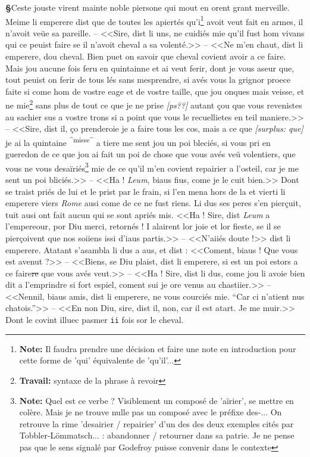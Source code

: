 \documentclass[12pt]{article} %
\newcommand{\persName}[1]{\emph{#1}} %
\newcommand{\placeName}[1]{\emph{#1}} %
\newcommand{\num}[1]{\texttt{#1}}    %
\newcommand{\add}[1]{\textsuperscript{#1}}       %
\newcommand{\uncertain}[1]{\textit{[#1?]}} %
\newcommand{\fnnote}[1]{\footnote{\textbf{Note:} #1}} %
\newcommand{\fnworknote}[1]{\footnote{\textbf{Travail:} #1}} %
\newcommand{\del}[1]{\sout{#1}}      %
\newcommand{\surplus}[1]{\textit{[surplus: #1]}} %
\newcounter{paranum}
\newcommand{\pnum}{\stepcounter{paranum}\textbf{§\arabic{paranum}}\quad}
\begin{document}
\pnum Ceste jouste virent mainte noble piersone qui mout en orent grant merveille. Meime li emperere dist que de toutes les apiertés qu'i\fnnote{Il faudra prendre une décision et faire une note en introduction pour cette forme de 'qui' équivalente de 'qu'il'...} avoit veut fait en armes, il n'avoit veüe sa pareille. -- <<Sire, dist li uns, ne cuidiés mie qu'il fust hom vivans qui ce peuist faire se il n'avoit cheval a sa volenté.>> -- <<Ne m'en chaut, dist li emperere, dou cheval. Bien puet on savoir que cheval covient avoir a ce faire. Mais jou aucune fois feru en quintainne et ai veut ferir, dont je vous aseur que, tout peuist on ferir de tous lés sans mesprendre, si avés vous la grignor proece faite si come hom de vostre eage et de vostre taille, que jou onques mais veisse, et ne mie\fnworknote{syntaxe de la phrase à revoir} sans plus de tout ce que je ne prise \uncertain{ps?} autant çou que vous revenistes au sachier sus a vostre trons si a point que vous le recuellietes en teil maniere.>> -- <<Sire, dist il, ço prenderoie je a faire tous les cos, mais a ce que \surplus{que} je ai la quintaine \add{^misse^} a tiere me sent jou un poi bleciés, si vous pri en gueredon de ce que jou ai fait un poi de chose que vous avés veü volentiers, que vous ne vous desaïriés\fnnote{Quel est ce verbe ? Visiblement un composé de 'aïrier', se mettre en colère. Mais je ne trouve nulle pas un composé avec le préfixe des-... On retrouve la rime 'desairier / repairier' d'un des des deux exemples cités par Tobbler-Lömmatsch... : abandonner / retourner dans sa patrie. Je ne pense pas que le sens signalé par Godefroy puisse convenir dans le contexte} mie de ce qu'il m'en covient repairier a l'osteil, car je me sent un poi bliciés.>> -- <<Ha ! \persName{Leum}, biaus fius, come je le cuit bien.>> Dont se traist priés de lui et le prist par le frain, si l'en mena hors de la et vierti li emperere viers \placeName{Rome} ausi come de ce ne fust riens. Li dus ses peres s'en pierçuit, tuit ausi ont fait aucun qui se sont apriés mis. <<Ha ! Sire, dist \persName{Leum} a l'empereour, por Diu merci, retornés ! I alairent lor joie et lor fieste, se il se pierçoivent que nos soiiens issi d'iaus partis.>> -- <<N'aiiés doute !>> dist li emperere. Atatant s'asambla li dus a aus, et dist : <<Coment, biaus ! Que vous est avenut ?>> -- <<Biens, se Diu plaist, dist li emperere, si est un poi estors a ce faire\del{re} que vous avés veut.>> -- <<Ha ! Sire, dist li dus, come jou li avoie bien dit a l'emprindre si fort espiel, coment sui je ore venus au chastiier.>> -- <<Nennil, biaus amis, dist li emperere, ne vous courciés mie. ``Car ci n'atient nus chatois.''>> -- <<En non Diu, sire, dist il, non, car il est atart. Je me muir.>> Dont le covint illuec pasmer \num{ii} fois sor le cheval.
\end{document}
